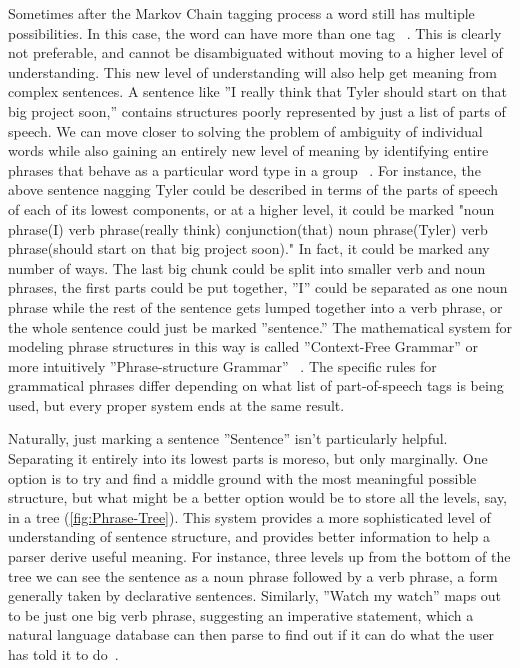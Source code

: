 \documentclass[12pt]{article}
\begin{document}
Sometimes after the Markov Chain tagging process a word still has multiple possibilities. In this case, the word can have more than one tag ~\citep{Tomita}. This is clearly not preferable, and cannot be disambiguated without moving to a higher level of understanding. This new level of understanding will also help get meaning from complex sentences. A sentence like ''I really think that Tyler should start on that big project soon,'' contains structures poorly represented by just a list of parts of speech. We can move closer to solving the problem of ambiguity of individual words while also gaining an entirely new level of meaning by identifying entire phrases that behave as a particular word type in a group ~\citep{Jurafsky}. For instance, the above sentence nagging Tyler could be described in terms of the parts of speech of each of its lowest components, or at a higher level, it could be marked "noun phrase(I) verb phrase(really think) conjunction(that) noun phrase(Tyler) verb phrase(should start on that big project soon)." In fact, it could be marked any number of ways. The last big chunk could be split into smaller verb and noun phrases, the first parts could be put together, ''I'' could be separated as one noun phrase while the rest of the sentence gets lumped together into a verb phrase, or the whole sentence could just be marked ''sentence.'' The mathematical system for modeling phrase structures in this way is called ''Context-Free Grammar'' or more intuitively ''Phrase-structure Grammar'' ~\citep{Peters}. The specific rules for grammatical phrases differ depending on what list of part-of-speech tags is being used, but every proper system ends at the same result.

Naturally, just marking a sentence ''Sentence'' isn't particularly helpful. Separating it entirely into its lowest parts is moreso, but only marginally.  One option is to try and find a middle ground with the most meaningful possible structure, but what might be a better option would be to store all the levels, say, in a tree (\ref{fig:Phrase-Tree}). This system provides a more sophisticated level of understanding of sentence structure, and provides better information to help a parser derive useful meaning. For instance, three levels up from the bottom of the tree we can see the sentence as a noun phrase followed by a verb phrase, a form generally taken by declarative sentences. Similarly, ''Watch my watch'' maps out to be just one big verb phrase, suggesting an imperative statement, which a natural language database can then parse to find out if it can do what the user has told it to do~\citep{Jurafsky}. 
\end{document}

